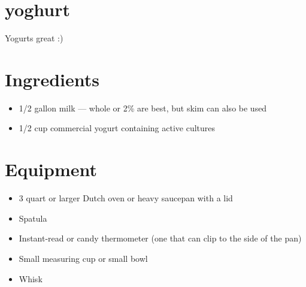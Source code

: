 \section{yoghurt}
Yogurts great :)
\section{Ingredients}
\begin{itemize}
\item 1/2 gallon milk — whole or 2\% are best, but skim can also be used
\item 1/2 cup commercial yogurt containing active cultures
\end{itemize}

\section{Equipment}
\begin{itemize}
\item 3 quart or larger Dutch oven or heavy saucepan with a lid
\item Spatula
\item Instant-read or candy thermometer (one that can clip to the side of the pan)
\item Small measuring cup or small bowl
\item Whisk
\end{itemize}

